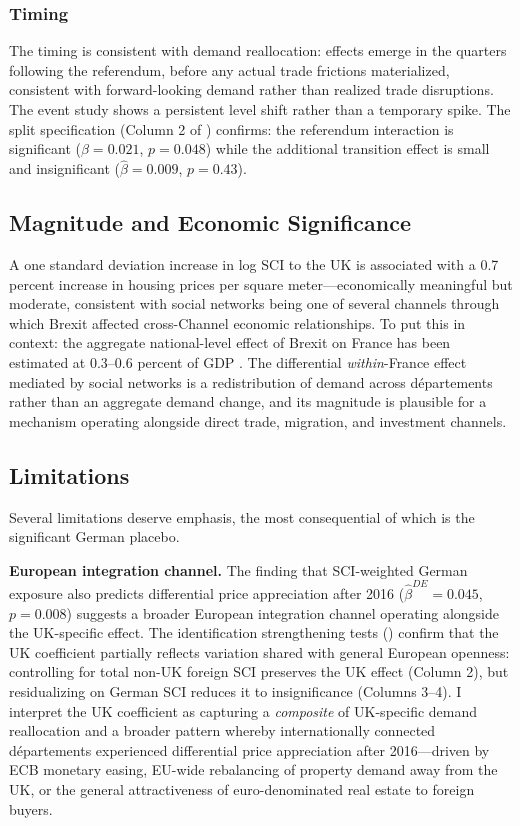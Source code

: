 \documentclass[12pt]{article}
\begin{document}


\subsubsection{Timing}

The timing is consistent with demand reallocation: effects emerge in the quarters following the referendum, before any actual trade frictions materialized, consistent with forward-looking demand rather than realized trade disruptions. The event study shows a persistent level shift rather than a temporary spike. The split specification (Column 2 of ) confirms: the referendum interaction is significant ($\hat{\beta} = 0.021$, $p = 0.048$) while the additional transition effect is small and insignificant ($\hat{\beta} = 0.009$, $p = 0.43$).

\subsection{Magnitude and Economic Significance}

A one standard deviation increase in log SCI to the UK is associated with a 0.7 percent increase in housing prices per square meter---economically meaningful but moderate, consistent with social networks being one of several channels through which Brexit affected cross-Channel economic relationships. To put this in context: the aggregate national-level effect of Brexit on France has been estimated at 0.3--0.6 percent of GDP \citep{dhingra2017local}. The differential \textit{within}-France effect mediated by social networks is a redistribution of demand across d\'epartements rather than an aggregate demand change, and its magnitude is plausible for a mechanism operating alongside direct trade, migration, and investment channels.

\subsection{Limitations}

Several limitations deserve emphasis, the most consequential of which is the significant German placebo.

\textbf{European integration channel.} The finding that SCI-weighted German exposure also predicts differential price appreciation after 2016 ($\hat{\beta}^{DE} = 0.045$, $p = 0.008$) suggests a broader European integration channel operating alongside the UK-specific effect. The identification strengthening tests () confirm that the UK coefficient partially reflects variation shared with general European openness: controlling for total non-UK foreign SCI preserves the UK effect (Column 2), but residualizing on German SCI reduces it to insignificance (Columns 3--4). I interpret the UK coefficient as capturing a \textit{composite} of UK-specific demand reallocation and a broader pattern whereby internationally connected d\'epartements experienced differential price appreciation after 2016---driven by ECB monetary easing, EU-wide rebalancing of property demand away from the UK, or the general attractiveness of euro-denominated real estate to foreign buyers.
\end{document}
